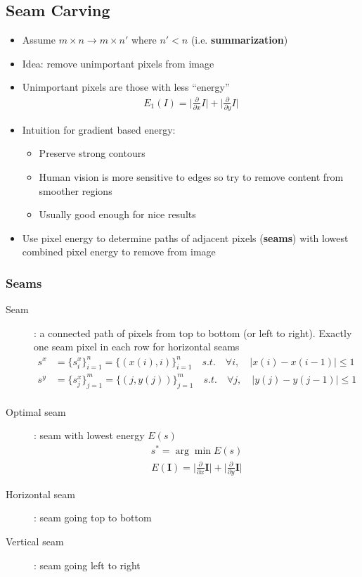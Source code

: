 \documentclass[letterpaper,12pt]{article}
\newcommand{\matr}[1]{\mathbf{#1}}
\newcommand{\abs}[1]{\lvert#1\rvert}
\begin{document}
\subsection{Seam Carving}
\begin{itemize}
 \item Assume $m \times n \to m \times n'$ where $n' < n$ (i.e. \textbf{summarization})
 \item Idea: remove unimportant pixels from image
 \item Unimportant pixels are those with less ``energy''
       \begin{align}
        E_1(I) = \abs{\frac{\partial}{\partial x} I} + \abs{\frac{\partial}{\partial y} I}
       \end{align}
 \item Intuition for gradient based energy:
       \begin{itemize}
        \item Preserve strong contours
        \item Human vision is more sensitive to edges so try to remove content from smoother regions
        \item Usually good enough for nice results
       \end{itemize}
 \item Use pixel energy to determine paths of adjacent pixels (\textbf{seams}) with lowest combined pixel energy to remove from image
\end{itemize}

\subsubsection{Seams}
\begin{description}
 \item[Seam]: a connected path of pixels from top to bottom (or left to right). Exactly one seam pixel in each row for horizontal seams
       \begin{align}
        s^x & = \{s_i^x\}^n_{i=1} = \{(x(i), i)\}^n_{i=1} \quad s.t. \quad \forall i, \quad \abs{x(i) - x(i-1)} \leq 1 \\
        s^y & = \{s_j^x\}^m_{j=1} = \{(j, y(j))\}^m_{j=1} \quad s.t. \quad \forall j, \quad \abs{y(j) - y(j-1)} \leq 1 \\
       \end{align}
 \item[Optimal seam]: seam with lowest energy $E(s)$
       \begin{align}
        s^* = \arg \min E(s)
       \end{align}
       \begin{align}
        E(\matr{I}) = \abs{\frac{\partial}{\partial x} \matr{I}} + \abs{\frac{\partial}{\partial y} \matr{I}}
       \end{align}
 \item[Horizontal seam]: seam going top to bottom
 \item[Vertical seam]: seam going left to right
\end{description}
\end{document}
